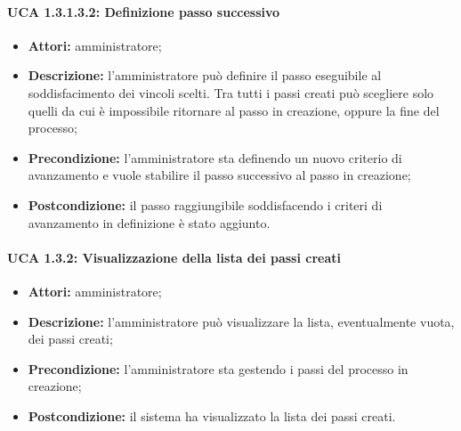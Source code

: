 \paragraph{UCA 1.3.1.3.2: Definizione passo successivo}
\begin{itemize}
\item \textbf{Attori:} 
amministratore;
\item \textbf{Descrizione:}
l'amministratore può definire il passo eseguibile al soddisfacimento dei vincoli scelti. Tra tutti i passi creati può scegliere solo quelli da cui è impossibile ritornare al passo in creazione, oppure la fine del processo;
\item \textbf{Precondizione:} 
l'amministratore sta definendo un nuovo criterio di avanzamento e vuole stabilire il passo successivo al passo in creazione;
\item \textbf{Postcondizione:}
il passo raggiungibile soddisfacendo i criteri di avanzamento in definizione è stato aggiunto.
\end{itemize}

\paragraph{UCA 1.3.2: Visualizzazione della lista dei passi creati}
\begin{itemize}
\item \textbf{Attori:} 
amministratore;
\item \textbf{Descrizione:}
l'amministratore può visualizzare la lista, eventualmente vuota, dei passi creati;
\item \textbf{Precondizione:} 
l'amministratore sta gestendo i passi del processo in creazione;
\item \textbf{Postcondizione:}
il sistema ha visualizzato la lista dei passi creati.
\end{itemize}

